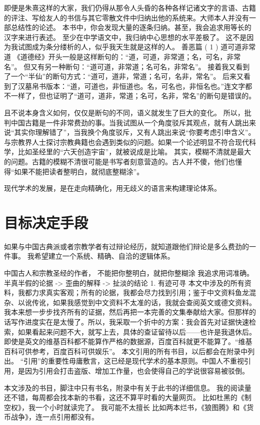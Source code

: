即便是朱熹这样的大家，我们仍得从那令人头昏的各种各样记诸文字的言语、古籍的评注、写给友人的书信与其它零散文件中归纳出他的系统来。大师本人并没有一部总结性的论述。
本书中，你会发现大量的逐条归纳。甚至，我会追求用等长的汉字来进行表述。
至少在中学语文中，我归纳中心思想的水平差极了。
这不是因为我试图成为条分缕析的人，似乎我天生就是这样的人。
善恶篇
( 1 ) 道可道非常道
《道德经》开头一般是这样断句的：“道，可道，非常道；名，可名，非常名”。
但又有另一种断句：“道可道，非常道；名可名，非常名”。
接着我又看到了一个“半仙”的断句方式：“道可，道非，常道；名可，名非，常名”。
后来又看到了汉墓帛书版本：“道，可道也，非恒道也。名，可名也，非恒名也。”连文字都不一样了，但也证明了“道可，道非，常道；名可，名非，常名”的断句是错误的。

且不说本身含义如何，仅仅是断句的不同，语义就发生了巨大的变化。
所以，批判中国古籍是一件非常费劲的事。当我试图从一个角度驳斥其观点，就有人跳出来说“其实你理解错了”，当我换个角度驳斥，又有人跳出来说“你要考虑引申含义”。
与宗教界人士探讨宗教典籍也会遇到类似的问题。如果一个论述明显不符合现代科学，比如圣经里的“六天创造宇宙”，就被说成是比喻。
其实，模糊不清就是最大的问题。古籍的模糊不清很可能是书写者刻意营造的。古人并不傻，他们也懂得“如果不能把读者整明白，就彻底整糊涂”。

现代学术的发展，是在走向精确化，用无歧义的语言来构建理论体系。

\section{目标决定手段}


如果与中国古典派或者宗教学者有过辩论经历，就知道跟他们辩论是多么费劲的一件事。
我希望建立一个系统、精确、自洽的逻辑体系。

中国古人和宗教圣经的作者，
不能把你整明白，就把你整糊涂
我追求用词准确。
半真半假的论据 -> 歪曲的解释 -> 扯淡的结论
1. 有迹可寻
本文中涉及的所有资料，我都力求真实客观；所有的论据，我都会尽力找到引用；鉴于中文资料鱼龙混杂、以讹传讹，如果我感觉到中文资料不太准的话，我就会查阅英文或德文资料。
我本来想一步步找齐所有的证据，然后再把一本完善的文集奉献给大家。但那样的话写作进度实在是太慢了。所以，我采取一个折中的方案：我会首先对证据快速检索，如果看起来问题不大，就写上去，具体的查证留待以后——也许是我退休后。
即使是英文的维基百科都不能算作严格的数据源，百度百科就更不能算了。“维基百科可供参考，百度百科可供娱乐”。
本文引用的所有书目，以后都会在附录中列出。
“引用”的重要性毋庸敷言，这已经是现代学术的基本原则。中国人不重视引用，是因为引用会打击盗版、增加工作量，也会使得自己的学说很容易被驳倒。


本文涉及的书目，脚注中只有书名，附录中有关于此书的详细信息。
我的阅读量还不错，每周都会找本新的书看，这还不算平时看的大量网页。
比如杜黑的《制空权》，我一个小时就读完了。
我可能不太擅长
比如两本烂书，《狼图腾》和《货币战争》，连一点引用都没有。

